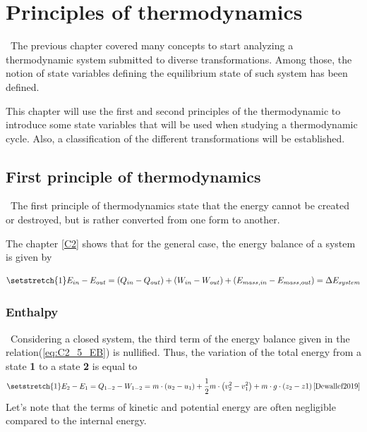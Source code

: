 \graphicspath{{Chapitre_2_5/Images/}}
\chapter{Principles of thermodynamics}\label{C2_5}

\quad\ The previous chapter covered many concepts to start analyzing a thermodynamic system submitted to diverse transformations. Among those, the notion of state variables defining the equilibrium state of such system has been defined. 

This chapter will use the first and second principles of the thermodynamic to introduce some state variables that will be used when studying a thermodynamic cycle. Also, a classification of the different transformations will be established.
\section{First principle of thermodynamics}
\quad\ The first principle of thermodynamics state that the energy cannot be created or destroyed, but is rather converted from one form to another.

The chapter \ref{C2} shows that for the general case, the energy balance of a system is given by 

\begin{equation}
  \setstretch{1}
  E_{in} - E_{out} = (Q_{in} - Q_{out}) + (W_{in} - W_{out}) + (E_{mass,in} - E_{mass,out}) = \Delta E_{system} \label{eq:C2_5_EB}
\end{equation}

\subsection{Enthalpy}
\quad\ Considering a closed system, the third term of the energy balance given in the relation(\ref{eq:C2_5_EB}) is nullified. Thus, the variation of the total energy from a state \textbf{1} to a state \textbf{2} is equal to
\begin{equation}
\setstretch{1}
E_{2} - E_{1} = Q_{1-2} - W_{1-2} = m\cdot\left(u_2 - u_1\right) + \frac{1}{2}m\cdot\left(v^2_2 - v^2_1\right) + m\cdot g\cdot\left(z_2 - z1\right)\citep{Dewallef2019} \label{eq:C2_5_EBC}
\end{equation}
Let's note that the terms of kinetic and potential energy are often negligible compared to the internal energy.  

